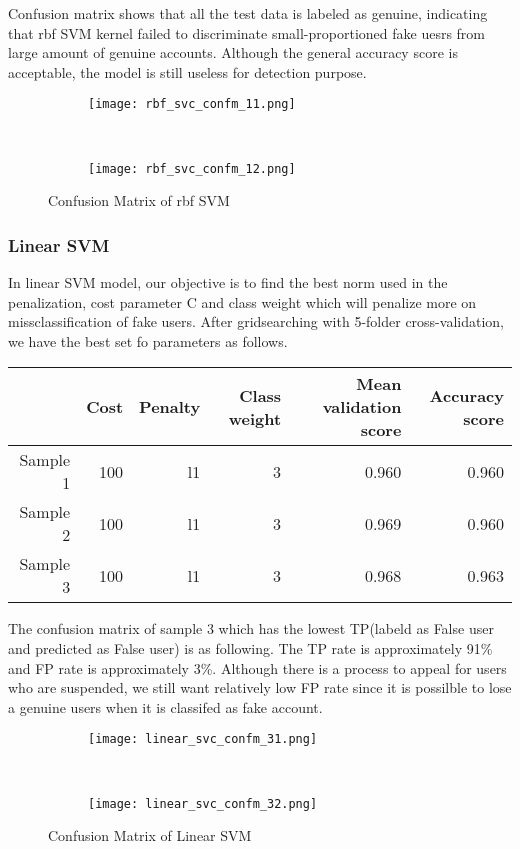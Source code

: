 \documentclass[a4paper, 12pt]{report}
\begin{document}
\noindent Confusion matrix shows that all the test data is labeled as genuine, indicating that rbf SVM kernel failed to discriminate small-proportioned fake uesrs from large amount of genuine accounts. Although the general accuracy score is acceptable, the model is still useless for detection purpose.
\begin{figure}[h!]
	\centering
	\begin{subfigure}[c]{0.45\linewidth}
		\texttt{[image: rbf\_svc\_confm\_11.png]}
	\end{subfigure}
	~
	\begin{subfigure}[c]{0.45\linewidth}
		\texttt{[image: rbf\_svc\_confm\_12.png]}
	\end{subfigure}
	\caption{Confusion Matrix of rbf SVM}
\end{figure}


\subsubsection*{Linear SVM}
In linear SVM model, our objective is to find the best norm used in the penalization, cost parameter C and class weight which will penalize more on missclassification of fake users. After gridsearching with 5-folder cross-validation, we have the best set fo parameters as follows.

\begin{table}[h!]
	 \label{tab:title} 
	\begin{center}
		\begin{tabular}{rrrrrr}
			\hline
			& Cost & Penalty & Class weight & Mean validation score & Accuracy score\\
			\hline
			Sample 1 & 100 & l1 & 3 & 0.960 & 0.960\\
			Sample 2 & 100 & l1 & 3 & 0.969 & 0.960\\
			Sample 3 & 100 & l1 & 3 & 0.968 & 0.963\\
			\hline
		\end{tabular}
	\end{center}
\end{table}

\noindent The confusion matrix of sample 3 which has the lowest TP(labeld as False user and predicted as False user) is as following. The TP rate is approximately 91\% and FP rate is approximately 3\%. Although there is a process to appeal for users who are suspended, we still want relatively low FP rate since it is possilble to lose a genuine users when it is classifed as fake account.
\begin{figure}[h!]
	\centering
	\begin{subfigure}[c]{0.45\linewidth}
		\texttt{[image: linear\_svc\_confm\_31.png]}
	\end{subfigure}
	~
	\begin{subfigure}[c]{0.45\linewidth}
		\texttt{[image: linear\_svc\_confm\_32.png]}
	\end{subfigure}
	\caption{Confusion Matrix of Linear SVM}
\end{figure}
\end{document}
